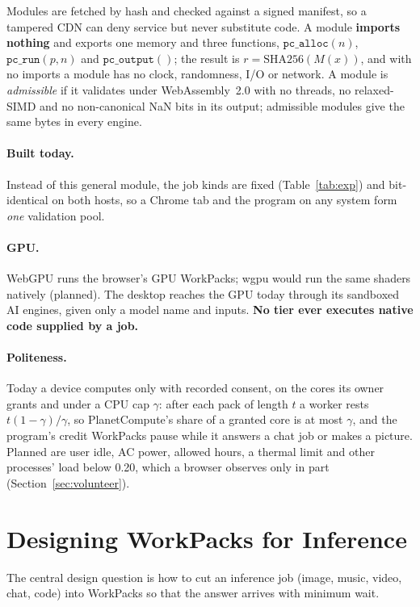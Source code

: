\documentclass[11pt,a4paper]{article}
\theoremstyle{definition}
\theoremstyle{plain}
\begin{document}
Modules are fetched by hash and checked against a signed manifest, so a tampered CDN can deny service but never
substitute code. A module \textbf{imports nothing} and exports one memory
and three functions, $\texttt{pc\_alloc}(n)$, $\texttt{pc\_run}(p,n)$ and $\texttt{pc\_output}()$; the result
is $r=\mathrm{SHA256}(M(x))$, and with no imports a module has no clock, randomness, I/O or network. A module is
\emph{admissible} if it validates under WebAssembly~2.0 \citep{w3c2025wasm} with no threads, no relaxed-SIMD and
no non-canonical NaN bits in its output; admissible modules give the same bytes in every engine.

\paragraph{Built today.} Instead of this general module, the job kinds are fixed (Table~\ref{tab:exp}) and
bit-identical on both hosts, so a Chrome tab and the program on any system form \emph{one} validation pool.

\paragraph{GPU.} WebGPU \citep{w3c2025webgpu} runs the browser's GPU WorkPacks; wgpu \citep{wgpu} would run the same shaders
natively (planned). The desktop reaches the GPU today through its sandboxed AI engines, given only a model name
and inputs. \textbf{No tier ever executes native code supplied by a job.}

\paragraph{Politeness.} Today a device computes only with recorded consent, on the cores its owner grants and
under a CPU cap $\gamma$: after each pack of length $t$ a worker rests $t(1-\gamma)/\gamma$, so PlanetCompute's share
of a granted core is at most $\gamma$, and the program's credit WorkPacks pause while it answers a chat job or makes a
picture. Planned are user idle, AC power, allowed hours, a thermal limit and other processes' load below
0.20, which a browser observes only in part (Section~\ref{sec:volunteer}).

\section{Designing WorkPacks for Inference}\label{sec:design}

The central design question is how to cut an inference job (image, music, video, chat, code) into WorkPacks so
that the answer arrives with minimum wait.
\end{document}
